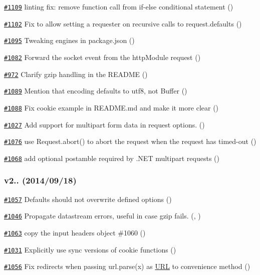\begin{DoxyItemize}
\item \href{https://github.com/request/request/pull/1109}{\tt \#1109} linting fix\+: remove function call from if-\/else conditional statement ()
\item \href{https://github.com/request/request/pull/1102}{\tt \#1102} Fix to allow setting a {\ttfamily requester} on recursive calls to {\ttfamily request.\+defaults} ()
\item \href{https://github.com/request/request/pull/1095}{\tt \#1095} Tweaking engines in package.\+json ()
\item \href{https://github.com/request/request/pull/1082}{\tt \#1082} Forward the socket event from the http\+Module request ()
\item \href{https://github.com/request/request/pull/972}{\tt \#972} Clarify gzip handling in the R\+E\+A\+D\+ME ()
\item \href{https://github.com/request/request/pull/1089}{\tt \#1089} Mention that encoding defaults to utf8, not Buffer ()
\item \href{https://github.com/request/request/pull/1088}{\tt \#1088} Fix cookie example in R\+E\+A\+D\+M\+E.\+md and make it more clear ()
\item \href{https://github.com/request/request/pull/1027}{\tt \#1027} Add support for multipart form data in request options. ()
\item \href{https://github.com/request/request/pull/1076}{\tt \#1076} use Request.\+abort() to abort the request when the request has timed-\/out ()
\item \href{https://github.com/request/request/pull/1068}{\tt \#1068} add optional postamble required by .N\+ET multipart requests ()
\end{DoxyItemize}

\subsubsection*{v2.. (2014/09/18)}


\begin{DoxyItemize}
\item \href{https://github.com/request/request/pull/1057}{\tt \#1057} Defaults should not overwrite defined options ()
\item \href{https://github.com/request/request/pull/1046}{\tt \#1046} Propagate datastream errors, useful in case gzip fails. (, )
\item \href{https://github.com/request/request/pull/1063}{\tt \#1063} copy the input headers object \#1060 ()
\item \href{https://github.com/request/request/pull/1031}{\tt \#1031} Explicitly use sync versions of cookie functions ()
\item \href{https://github.com/request/request/pull/1056}{\tt \#1056} Fix redirects when passing url.\+parse(x) as \mbox{\hyperlink{namespace_u_r_l}{U\+RL}} to convenience method ()
\end{DoxyItemize}

